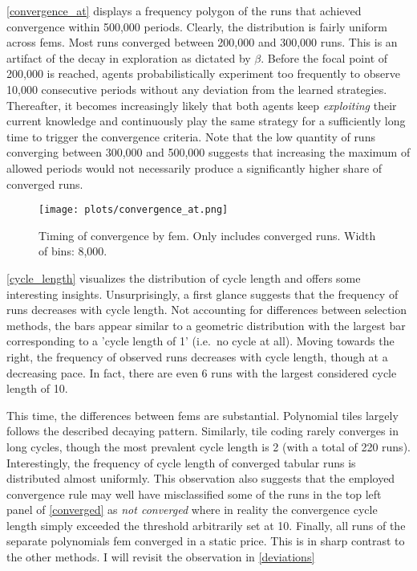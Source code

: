 \autoref{convergence_at} displays a frequency polygon of the runs that achieved convergence within 500,000 periods. Clearly, the distribution is fairly uniform across \gls{fem}s. Most runs converged between 200,000 and 300,000 runs. This is an artifact of the decay in exploration as dictated by $\beta$. Before the focal point of 200,000 is reached, agents probabilistically experiment too frequently to observe 10,000 consecutive periods without any deviation from the learned strategies. Thereafter, it becomes increasingly likely that both agents keep \emph{exploiting} their current knowledge and continuously play the same strategy for a sufficiently long time to trigger the convergence criteria. Note that the low quantity of runs converging between 300,000 and 500,000 suggests that increasing the maximum of allowed periods would not necessarily produce a significantly higher share of converged runs.

\begin{figure}
	\texttt{[image: plots/convergence\_at.png]}
	\caption[Timing of convergence by \gls{fem}]{Timing of convergence by \gls{fem}. Only includes converged runs. Width of bins: 8,000.}
	\label{convergence_at}
\end{figure}

\autoref{cycle_length} visualizes the distribution of cycle length and offers some interesting insights. Unsurprisingly, a first glance suggests that the frequency of runs decreases with cycle length. Not accounting for differences between selection methods, the bars appear similar to a geometric distribution with the largest bar corresponding to a 'cycle length of 1' (i.e.\ no cycle at all). Moving towards the right, the frequency of observed runs decreases with cycle length, though at a decreasing pace. In fact, there are even 6 runs with the largest considered cycle length of 10.

This time, the differences between \gls{fem}s are substantial. Polynomial tiles largely follows the described decaying pattern. Similarly, tile coding rarely converges in long cycles, though the most prevalent cycle length is 2 (with a total of 220 runs). Interestingly, the frequency of cycle length of converged tabular runs is distributed almost uniformly. This observation also suggests that the employed convergence rule may well have misclassified some of the runs in the top left panel of \autoref{converged} as \emph{not converged} where in reality the convergence cycle length simply exceeded the threshold arbitrarily set at 10. Finally, all runs of the separate polynomials \gls{fem} converged in a static price. This is in sharp contrast to the other methods. I will revisit the observation in \autoref{deviations} 

